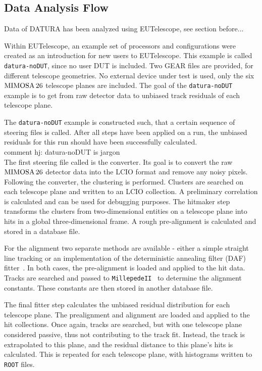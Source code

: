 \subsection{Data Analysis Flow}

Data of DATURA has been analyzed using EUTelescope, see section before...

\label{sec:datura-nodut}
Within EUTelescope, an example set of processors and configurations were created as an introduction for new users to EUTelescope.
This example is called \texttt{datura-noDUT}, since no user DUT is included.
Two GEAR files are provided, for different telescope geometries.
No external device under test is used, only the six $\textrm{MIMOSA\,26}$ telescope planes are included.
The goal of the \texttt{datura-noDUT} example is to get from raw detector data to unbiased track residuals of each telescope plane.

The \texttt{datura-noDUT} example is constructed such, that a certain sequence of steering files is called.
After all steps have been applied on a run, the unbiased residuals for this run should have been successfully calculated.
\\{comment hj: datura-noDUT is jargon}\\

The first steering file called is the converter.
Its goal is to convert the raw $\textrm{MIMOSA\,26}$ detector data into the LCIO format and remove any noisy pixels.
Following the converter, the clustering is performed.
Clusters are searched on each telescope plane and written to an LCIO collection.
A preliminary correlation is calculated and can be used for debugging purposes.
The hitmaker step transforms the clusters from two-dimensional entities on a telescope plane into hits in a global three-dimensional frame.
A rough pre-alignment is calculated and stored in a database file.

For the alignment two separate methods are available - either a simple straight line tracking or an implementation of the deterministic annealing filter (DAF) fitter~\cite{ref:daffitter}.
In both cases, the pre-alignment is loaded and applied to the hit data.
Tracks are searched and passed to \texttt{MillepedeII}~\cite{Blobel-2006} to determine the alignment constants.
These constants are then stored in another database file.

The final fitter step calculates the unbiased residual distribution for each telescope plane.
The prealignment and alignment are loaded and applied to the hit collections.
Once again, tracks are searched, but with one telescope plane considered passive, thus not contributing to the track fit.
Instead, the track is extrapolated to this plane, and the residual distance to this plane's hits is calculated.
This is repeated for each telescope plane, with histograms written to \texttt{ROOT} files.

